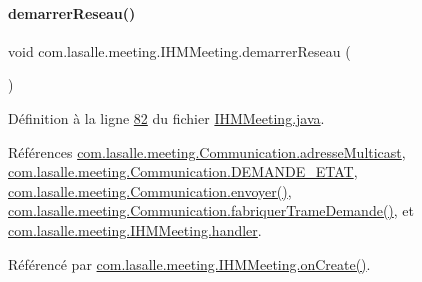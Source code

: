 \paragraph{\texorpdfstring{demarrer\+Reseau()}{demarrerReseau()}}
{\footnotesize\ttfamily void com.\+lasalle.\+meeting.\+I\+H\+M\+Meeting.\+demarrer\+Reseau (\begin{DoxyParamCaption}{ }\end{DoxyParamCaption})\hspace{0.3cm}{\ttfamily [private]}}



Définition à la ligne \hyperlink{_i_h_m_meeting_8java_source_l00082}{82} du fichier \hyperlink{_i_h_m_meeting_8java_source}{I\+H\+M\+Meeting.\+java}.



Références \hyperlink{_communication_8java_source_l00040}{com.\+lasalle.\+meeting.\+Communication.\+adresse\+Multicast}, \hyperlink{_communication_8java_source_l00055}{com.\+lasalle.\+meeting.\+Communication.\+D\+E\+M\+A\+N\+D\+E\+\_\+\+E\+T\+AT}, \hyperlink{_communication_8java_source_l00090}{com.\+lasalle.\+meeting.\+Communication.\+envoyer()}, \hyperlink{_communication_8java_source_l00180}{com.\+lasalle.\+meeting.\+Communication.\+fabriquer\+Trame\+Demande()}, et \hyperlink{_i_h_m_meeting_8java_source_l00311}{com.\+lasalle.\+meeting.\+I\+H\+M\+Meeting.\+handler}.



Référencé par \hyperlink{_i_h_m_meeting_8java_source_l00060}{com.\+lasalle.\+meeting.\+I\+H\+M\+Meeting.\+on\+Create()}.


